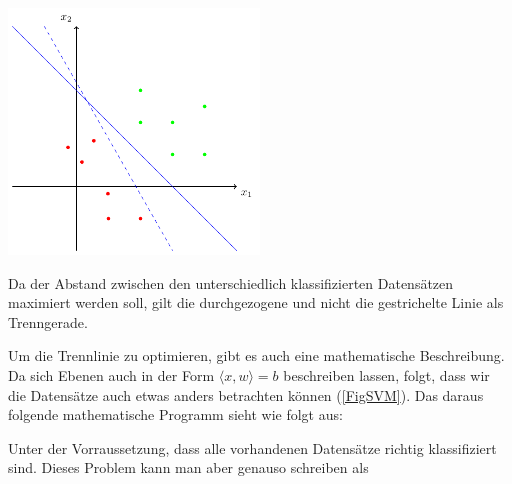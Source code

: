 \begin{dsafigure}
	\begin{center}
		\includegraphics[width=0.5\textwidth]{Figure_SimpleSVM}
		\caption{Da der Abstand zwischen den unterschiedlich klassifizierten Datensätzen maximiert werden soll, gilt die durchgezogene und nicht die gestrichelte Linie als Trenngerade.}
		\label{FigSimpleSVM}
	\end{center}
\end{dsafigure}

Um die Trennlinie zu optimieren, gibt es auch eine mathematische Beschreibung. Da sich Ebenen auch in der Form $\langle x, w \rangle = b $ beschreiben lassen, folgt, dass wir die Datensätze auch etwas anders betrachten können (\ref{FigSVM}).
Das daraus folgende mathematische Programm sieht wie folgt aus: 


Unter der Vorraussetzung, dass alle vorhandenen Datensätze richtig klassifiziert sind. Dieses Problem kann 
man aber genauso schreiben als 

%

